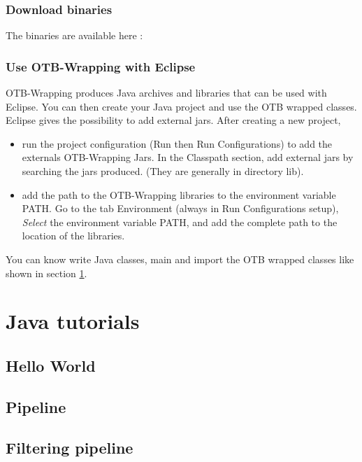 \subsubsection{Download binaries}
The binaries are available here :

\subsubsection{Use OTB-Wrapping with Eclipse}
OTB-Wrapping produces Java archives and libraries that can be used with Eclipse. You can then create your Java project and use the OTB wrapped classes. 
Eclipse gives the possibility to add external jars. 
After creating a new project, 
\begin{itemize}
\item run the project configuration (Run then Run Configurations) to add the externals OTB-Wrapping Jars. In the Classpath section, add external jars 
  by searching the jars produced. (They are generally in directory lib).
\item add the path to the OTB-Wrapping libraries to  the environment variable PATH. Go to the tab Environment (always in Run Configurations setup), 
  \emph{Select} the environment variable PATH, and add the complete path to the location of the libraries.
\end{itemize}

You can know write Java classes, main and import the OTB wrapped classes like shown in section \ref{sec:tuto}.


\normalsize
\section{Java tutorials}\label{sec:tuto}

\subsection{Hello World}


\subsection{Pipeline}


\subsection{Filtering pipeline}


